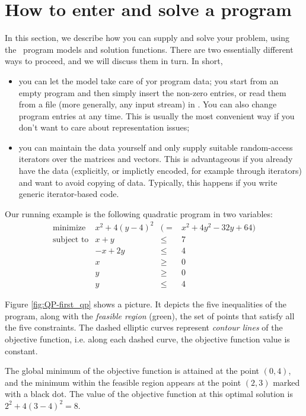 \section{How to enter and solve a program}
\label{sec:QP-first}
In this section, we describe how you can supply and solve your problem, 
using the \cgal\ program models and solution functions. 
There are two essentially different ways to proceed, 
and we will discuss them in turn. In short, 
\begin{itemize}
\item you can let the model take care of yor program data; you start 
from an empty program and then simply insert the non-zero entries, or
read them from a file (more generally, any input stream) in 
. You can also change program entries at any time. 
This is usually the most convenient way if you don't want to care
about representation issues;
\item you can maintain the data yourself and only supply suitable 
random-access iterators over the matrices and vectors. This is 
advantageous if you already have the data (explicitly, or implictly
encoded, for example through iterators) and want to avoid copying 
of data. Typically, this happens if you write generic iterator-based 
code. 
\end{itemize}
 
Our running example is the following quadratic program in two variables:
\[
\begin{array}{lrcl}
\mbox{minimize}       & x^2 + 4(y-4)^2 &(=& x^2 + 4y^2 - 32y + 64) \\
\mbox{subject to}     & x + y &\leq& 7 \\
                      & -x + 2y &\leq& 4 \\
                      & x &\geq& 0 \\
                      & y &\geq& 0 \\
                      & y &\leq& 4
\end{array}
\]

Figure \ref{fig:QP-first_qp} shows a picture. It
depicts the five inequalities of the program, along with the
\emph{feasible region} (green), the set of points that satisfy all the
five constraints. The dashed elliptic curves represent \emph{contour lines} 
of the objective function, i.e. along each dashed curve, the objective
function value is constant. 

The global minimum of the objective function is attained at 
the point $(0,4)$, and the minimum within the feasible region appears
at the point $(2,3)$ marked with a black dot. The value of the objective
function at this optimal solution is $2^2 + 4(3-4)^2 = 8$.

